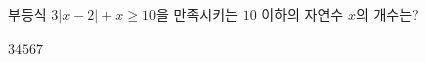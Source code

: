 부등식 $3|x-2|+x\ge 10$을 만족시키는 $10$ 이하의 자연수 $x$의 개수는?
\begin{choices32}{$3$}{$4$}{$5$}{$6$}{$7$}\end{choices32}
